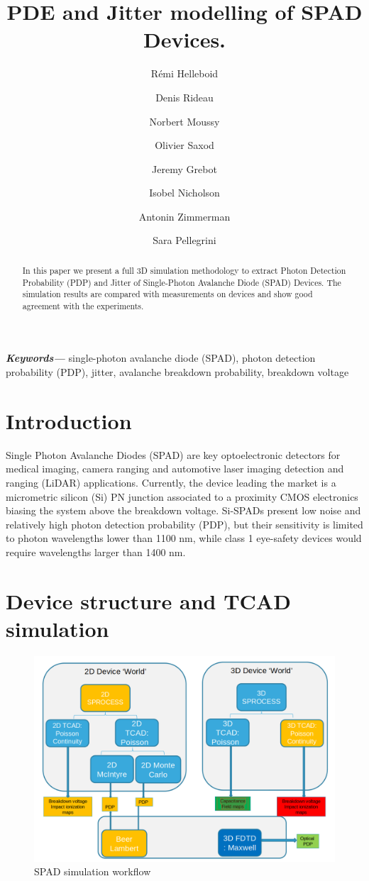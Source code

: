 \documentclass[10pt,a4paper,twocolumn]{article}
\title{PDE and Jitter modelling of SPAD Devices.}
\author[1]{Rémi Helleboid}
\author[1]{Denis Rideau}
\author[2]{Norbert Moussy}
\author[2]{Olivier Saxod}
\author[1]{Jeremy Grebot}
\author[1]{Isobel Nicholson}
\author[1]{Antonin Zimmerman}
\author[1]{Sara Pellegrini}
\affil[1]{ST Microelectronics, Crolles, France}
\affil[2]{CEA LETI, Grenoble, France}
\date{}                     %
\providecommand{\keywords}[1]
{
  \small	
  \textbf{\textit{Keywords---}} #1
}
\begin{document}
\maketitle

\begin{abstract}
In this paper we present a full 3D simulation methodology to extract Photon Detection Probability (PDP) and Jitter of Single-Photon Avalanche Diode (SPAD) Devices. The simulation results are compared with measurements on devices and show good agreement with the experiments.\\
\end{abstract}

\keywords{single-photon avalanche diode (SPAD), photon detection probability (PDP), jitter, avalanche breakdown probability, breakdown voltage}

\section{Introduction}
Single Photon Avalanche Diodes (SPAD) are key optoelectronic detectors for medical imaging, camera ranging and automotive laser imaging detection and ranging (LiDAR) applications. Currently, the device leading the market is a micrometric silicon (Si) PN junction associated to a proximity CMOS electronics biasing the system above the breakdown voltage. Si-SPADs present low noise and relatively high photon detection probability (PDP), but their sensitivity is limited to photon wavelengths lower than 1100 nm, while class 1 eye-safety devices would require wavelengths larger than 1400 nm.


\section{Device structure and TCAD simulation}
\begin{figure}[hbtp]
\caption{SPAD simulation workflow}
\includegraphics[scale=0.21]{../pictures/TCADWorkflow.png}
\end{figure}
\end{document}
